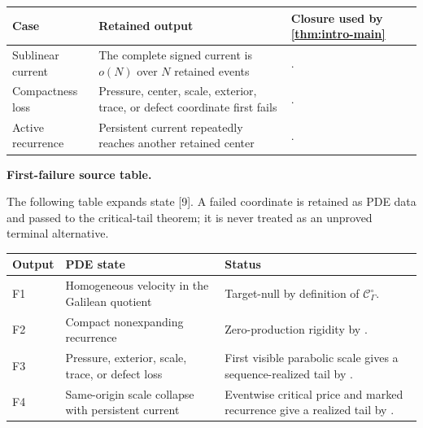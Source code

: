 \documentclass[11pt]{amsart}
\numberwithin{equation}{section}
\theoremstyle{plain}
\theoremstyle{definition}
\theoremstyle{remark}
\newcommand{\OscMass}{\mathcal C^{\circ}}
\begin{document}
\begin{center}
\small
\begin{tabular}{@{}L{0.14\textwidth}L{0.29\textwidth}L{0.43\textwidth}@{}}
\toprule
Case & Retained output & Closure used by \cref{thm:intro-main} \\
\midrule
Sublinear current & The complete signed current is \(o(N)\) over \(N\) retained events & . \\
Compactness loss & Pressure, center, scale, exterior, trace, or defect coordinate first fails & . \\
Active recurrence & Persistent current repeatedly reaches another retained center & . \\
\bottomrule
\end{tabular}
\end{center}

\medskip\noindent\textbf{First-failure source table.}\par\smallskip

The following table expands state [9].  A failed coordinate is retained as PDE
data and passed to the critical-tail theorem; it is never treated as an
unproved terminal alternative.

\begin{center}
\small
\begin{tabular}{@{}L{0.10\textwidth}L{0.34\textwidth}L{0.43\textwidth}@{}}
\toprule
Output & PDE state & Status \\
\midrule
F1 & Homogeneous velocity in the Galilean quotient & Target-null by definition of \(\OscMass_\Gamma\). \\
F2 & Compact nonexpanding recurrence & Zero-production rigidity by . \\
F3 & Pressure, exterior, scale, trace, or defect loss & First visible parabolic scale gives a sequence-realized tail by . \\
F4 & Same-origin scale collapse with persistent current & Eventwise critical price and marked recurrence give a realized tail by . \\
\bottomrule
\end{tabular}
\end{center}
\end{document}

